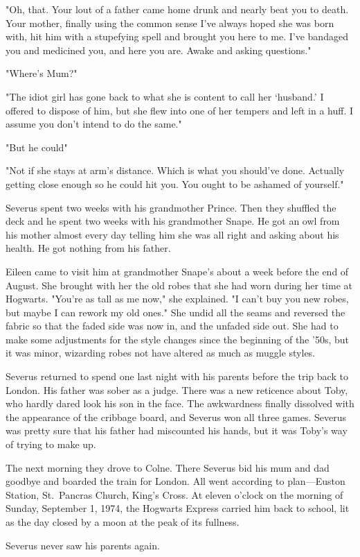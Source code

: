 "Oh, that. Your lout of a father came home drunk and nearly beat you to death. Your mother, finally using the common sense I've always hoped she was born with, hit him with a stupefying spell and brought you here to me. I've bandaged you and medicined you, and here you are. Awake and asking questions."

"Where's Mum?"

"The idiot girl has gone back to what she is content to call her `husband.' I offered to dispose of him, but she flew into one of her tempers and left in a huff. I assume you don't intend to do the same."

"But he could{\el}"

"Not if she stays at arm's distance. Which is what you should've done. Actually getting close enough so he could hit you. You ought to be ashamed of yourself."

Severus spent two weeks with his grandmother Prince. Then they shuffled the deck and he spent two weeks with his grandmother Snape. He got an owl from his mother almost every day telling him she was all right and asking about his health. He got nothing from his father.

Eileen came to visit him at grandmother Snape's about a week before the end of August. She brought with her the old robes that she had worn during her time at Hogwarts. "You're as tall as me now," she explained. "I can't buy you new robes, but maybe I can rework my old ones." She undid all the seams and reversed the fabric so that the faded side was now in, and the unfaded side out. She had to make some adjustments for the style changes since the beginning of the '50s, but it was minor, wizarding robes not have altered as much as muggle styles.

Severus returned to spend one last night with his parents before the trip back to London. His father was sober as a judge. There was a new reticence about Toby, who hardly dared look his son in the face. The awkwardness finally dissolved with the appearance of the cribbage board, and Severus won all three games. Severus was pretty sure that his father had miscounted his hands, but it was Toby's way of trying to make up.

The next morning they drove to Colne. There Severus bid his mum and dad goodbye and boarded the train for London. All went according to plan—Euston Station, St.~Pancras Church, King's Cross. At eleven o'clock on the morning of Sunday, September 1, 1974, the Hogwarts Express carried him back to school, lit as the day closed by a moon at the peak of its fullness.

Severus never saw his parents again.


